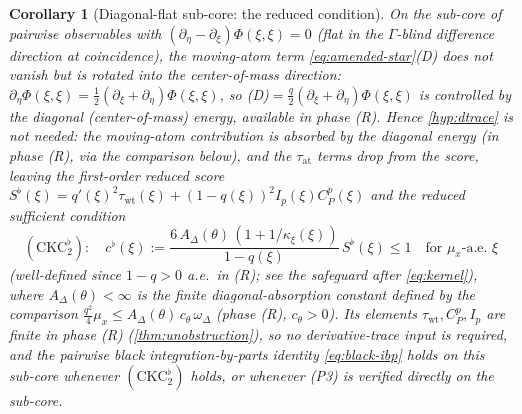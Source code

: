 \documentclass[reqno,final,11pt]{amsart}
\theoremstyle{plain}
\newtheorem{corollary}[theorem]{Corollary}
\theoremstyle{definition}
\theoremstyle{remark}
\begin{document}
\begin{corollary}[Diagonal-flat sub-core: the reduced condition]\label{cor:neumann-subcore}
On the sub-core of pairwise observables with
$(\partial_\eta-\partial_\xi)\Phi(\xi,\xi)=0$ (flat in the $\Gamma$-blind
difference direction at coincidence), the moving-atom term
\eqref{eq:amended-star}\textnormal{(D)} does not vanish but is rotated into the
center-of-mass direction: $\partial_\eta\Phi(\xi,\xi)
=\tfrac12(\partial_\xi+\partial_\eta)\Phi(\xi,\xi)$, so
\textnormal{(D)}$=\tfrac{q}{2}(\partial_\xi+\partial_\eta)\Phi(\xi,\xi)$ is
controlled by the diagonal (center-of-mass) energy, available in phase
\textnormal{(R)}. Hence \cref{hyp:dtrace} is not needed: the moving-atom
contribution is absorbed by the diagonal energy (in phase (R), via the
comparison below), and the $\tau_{\mathrm{at}}$ terms drop from the score,
leaving the first-order reduced score
$S^{\flat}(\xi)=q'(\xi)^2\tau_{\mathrm{wt}}(\xi)+(1-q(\xi))^2 I_p(\xi)C^p_P(\xi)$
and the reduced sufficient condition
\begin{equation}\label{eq:ckc-flat}
  (\mathrm{CKC}_2^{\flat}):\quad
  c^{\flat}(\xi):=\frac{6\,A_\Delta(\theta)\,(1+1/\kappa_\xi(\xi))}{1-q(\xi)}\,S^{\flat}(\xi)\le1
  \quad\text{for }\mu_x\text{-a.e. }\xi
\end{equation}
(well-defined since $1-q>0$ a.e.\ in (R); see the safeguard after
\eqref{eq:kernel}), where $A_\Delta(\theta)<\infty$ is the finite
diagonal-absorption constant defined by the comparison
$\tfrac{q^2}{4}\mu_x\le A_\Delta(\theta)\,c_\theta\,\omega_\Delta$
(phase (R), $c_\theta>0$).
Its elements $\tau_{\mathrm{wt}},C^p_P,I_p$ are finite in phase (R)
(\cref{thm:unobstruction}), so no derivative-trace input is required,
and the pairwise black integration-by-parts identity
\eqref{eq:black-ibp} holds on this sub-core whenever
$(\mathrm{CKC}_2^{\flat})$ holds, or whenever (P3) is verified directly on the
sub-core.
\end{corollary}
\end{document}
